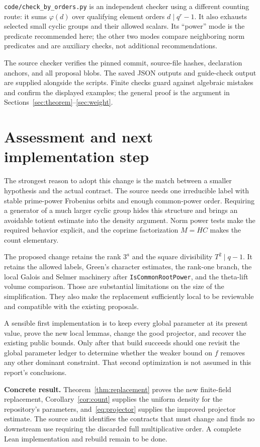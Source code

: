 \documentclass[11pt,a4paper]{article}
\newcommand{\src}[1]{\nolinkurl{#1}}
\theoremstyle{definition}
\theoremstyle{remark}
\begin{document}
\src{code/check_by_orders.py} is an independent checker using a different
counting route: it sums $\varphi(d)$ over qualifying element orders
$d\mid q^r-1$. It also exhausts selected small cyclic groups and their
allowed scalars. Its ``power'' mode is the predicate recommended here;
the other two modes compare neighboring norm predicates and are
auxiliary checks, not additional recommendations.

The source checker verifies the pinned commit, source-file hashes,
declaration anchors, and all proposal blobs. The saved JSON outputs and
guide-check output are supplied alongside the scripts. Finite checks
guard against algebraic mistakes and confirm the displayed examples;
the general proof is the argument in
Sections~\ref{sec:theorem}--\ref{sec:weight}.

\section{Assessment and next implementation step}

The strongest reason to adopt this change is the match between a smaller
hypothesis and the actual contract. The source needs one irreducible
label with stable prime-power Frobenius orbits and enough common-power
order. Requiring a generator of a much larger cyclic group hides this
structure and brings an avoidable totient estimate into the density
argument. Norm power tests make the required behavior explicit, and the
coprime factorization $M=HC$ makes the count elementary.

The proposed change retains the rank $3^a$ and the square divisibility
$T^2\mid q-1$. It retains the allowed labels, Green's character estimates,
the rank-one branch, the local Galois and Selmer machinery after
\src{IsCommonRootPower}, and the theta-lift volume comparison. Those are
substantial limitations on the size of the simplification. They also
make the replacement sufficiently local to be reviewable and compatible
with the existing proposals.

A sensible first implementation is to keep every global parameter at
its present value, prove the new local lemmas, change the good projector,
and recover the existing public bounds. Only after that build succeeds
should one revisit the global parameter ledger to determine whether
the weaker bound on $f$ removes any other dominant constraint. That
second optimization is not assumed in this report's conclusions.

\begin{keybox}
\textbf{Concrete result.} Theorem~\ref{thm:replacement} proves the new
finite-field replacement, Corollary~\ref{cor:count} supplies the uniform
density for the repository's parameters, and~\eqref{eq:projector}
supplies the improved projector estimate. The source audit identifies
the contracts that must change and finds no downstream use requiring
the discarded full multiplicative order. A complete Lean implementation
and rebuild remain to be done.
\end{keybox}
\end{document}
